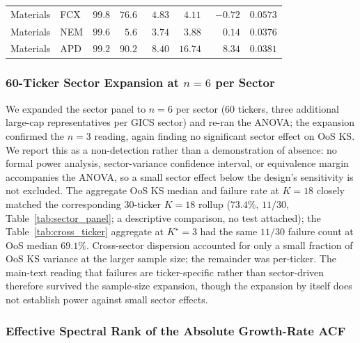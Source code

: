\begin{table}[!ht]
\begin{tabular}{l l r r r r r r}
\midrule
Materials               & FCX  & $99.8$ & $76.6$ & $\phantom{0}4.83$  & $\phantom{0}4.11$  & $-0.72$            & $0.0573$ \\
Materials               & NEM  & $99.6$ & $\phantom{0}5.6$ & $\phantom{0}3.74$  & $\phantom{0}3.88$  & $\phantom{-}0.14$  & $0.0376$ \\
Materials               & APD  & $99.2$ & $90.2$ & $\phantom{0}8.40$  & $16.74$            & $\phantom{-}8.34$  & $0.0381$ \\
\bottomrule
\end{tabular}
\end{table}

\subsubsection{\texorpdfstring{60-Ticker Sector Expansion at $n = 6$ per Sector}{60-Ticker Sector Expansion at n = 6 per Sector}}
\label{sec:sector_panel_n6}

We expanded the sector panel to $n = 6$ per sector (60 tickers, three additional large-cap representatives per GICS sector) and re-ran the ANOVA; the expansion confirmed the $n = 3$ reading, again finding no significant sector effect on OoS KS. We report this as a non-detection rather than a demonstration of absence: no formal power analysis, sector-variance confidence interval, or equivalence margin accompanies the ANOVA, so a small sector effect below the design's sensitivity is not excluded. The aggregate OoS KS median and failure rate at $K = 18$ closely matched the corresponding 30-ticker $K = 18$ rollup ($73.4\%$, $11/30$, Table~\ref{tab:sector_panel}; a descriptive comparison, no test attached); the Table~\ref{tab:cross_ticker} aggregate at $K^\star = 3$ had the same $11/30$ failure count at OoS median $69.1\%$. Cross-sector dispersion accounted for only a small fraction of OoS KS variance at the larger sample size; the remainder was per-ticker. The main-text reading that failures are ticker-specific rather than sector-driven therefore survived the sample-size expansion, though the expansion by itself does not establish power against small sector effects.

\subsubsection{Effective Spectral Rank of the Absolute Growth-Rate ACF}
\label{sec:spectral_rank}

